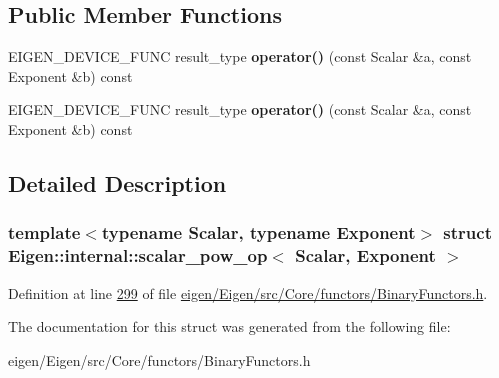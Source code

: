 \subsection*{Public Member Functions}
\begin{DoxyCompactItemize}
\item 
\mbox{\label{struct_eigen_1_1internal_1_1scalar__pow__op_a0d814f4a6832c9715a56cf21d2bd98fe}} 
E\+I\+G\+E\+N\+\_\+\+D\+E\+V\+I\+C\+E\+\_\+\+F\+U\+NC result\+\_\+type {\bfseries operator()} (const Scalar \&a, const Exponent \&b) const
\item 
\mbox{\label{struct_eigen_1_1internal_1_1scalar__pow__op_a0d814f4a6832c9715a56cf21d2bd98fe}} 
E\+I\+G\+E\+N\+\_\+\+D\+E\+V\+I\+C\+E\+\_\+\+F\+U\+NC result\+\_\+type {\bfseries operator()} (const Scalar \&a, const Exponent \&b) const
\end{DoxyCompactItemize}


\subsection{Detailed Description}
\subsubsection*{template$<$typename Scalar, typename Exponent$>$\newline
struct Eigen\+::internal\+::scalar\+\_\+pow\+\_\+op$<$ Scalar, Exponent $>$}



Definition at line \hyperlink{eigen_2_eigen_2src_2_core_2functors_2_binary_functors_8h_source_l00299}{299} of file \hyperlink{eigen_2_eigen_2src_2_core_2functors_2_binary_functors_8h_source}{eigen/\+Eigen/src/\+Core/functors/\+Binary\+Functors.\+h}.



The documentation for this struct was generated from the following file\+:\begin{DoxyCompactItemize}
\item 
eigen/\+Eigen/src/\+Core/functors/\+Binary\+Functors.\+h\end{DoxyCompactItemize}

